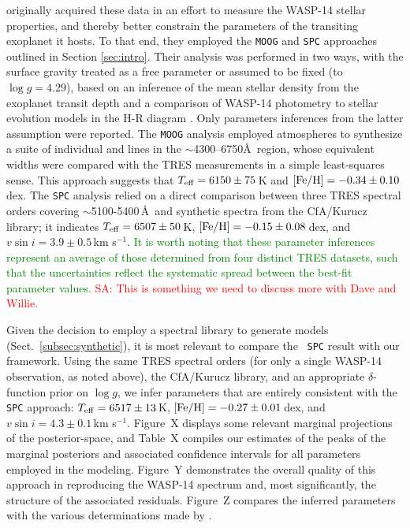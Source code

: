 \documentclass[iop,floatfix]{emulateapj}
\newcommand{\comm}[1]{ \textcolor{red}{SA: #1}}
\newcommand{\hili}[1]{ \textcolor{green}{#1}}
\begin{document}
\citet{torres12} originally acquired these data in an effort to measure the WASP-14 stellar 
properties, and thereby better constrain the parameters of the transiting exoplanet it hosts.  To 
that end, they employed the {\tt MOOG} and {\tt SPC} approaches outlined in Section 
\ref{sec:intro}.  Their analysis was performed in two ways, with the surface gravity treated as a 
free parameter or assumed to be fixed (to $\log g = 4.29$), based on an inference of the mean 
stellar density from the exoplanet transit depth and a comparison of WASP-14 photometry to stellar 
evolution models in the H-R diagram \citep{joshi09}.  Only parameters inferences from the latter 
assumption were reported.  The {\tt MOOG} analysis employed \citet{kurucz93} atmospheres to 
synthesize a suite of individual  and  lines in the $\sim$4300--6750\AA\ 
region, whose equivalent widths were compared with the TRES measurements in a simple least-squares 
sense.  This approach suggests that $T_{\rm eff} = 6150\pm75$\,K and $[{\rm Fe/H}] = 
-0.34\pm0.10$\,dex.  The {\tt SPC} analysis relied on a direct comparison between three TRES 
spectral orders covering $\sim$5100-5400\,\AA\ and synthetic spectra from the {\sc CfA/Kurucz} 
library; it indicates $T_{\rm eff} = 6507\pm50$\,K, $[{\rm Fe/H}] = -0.15\pm0.08$\,dex, and $v \sin 
i = 3.9\pm0.5$\,km s$^{-1}$.  \hili{It is worth noting that these parameter inferences represent an 
average of those determined from four distinct TRES datasets, such that the uncertainties reflect 
the systematic spread between the best-fit parameter values.} \comm{This is something we need to 
discuss more with Dave and Willie.}

Given the decision to employ a spectral library to generate models (Sect.~\ref{subsec:synthetic}), 
it is most relevant to compare the \citeauthor{torres12}~{\tt SPC} result with our framework.  
Using the same TRES spectral orders (for only a single WASP-14 observation, as noted above), the 
{\sc CfA/Kurucz} library, and an appropriate $\delta$-function prior on $\log g$, we infer 
parameters that are entirely consistent with the {\tt SPC} approach: $T_{\rm eff} = 6517\pm13$\,K, 
$[{\rm Fe/H}] = -0.27\pm0.01$\,dex, and $v \sin i = 4.3\pm0.1$\,km s$^{-1}$.  Figure~X displays 
some relevant marginal projections of the posterior-space, and Table~X compiles our estimates of 
the peaks of the marginal posteriors and associated confidence intervals for all parameters 
employed in the modeling.  Figure~Y demonstrates the overall quality of this approach in 
reproducing the WASP-14 spectrum and, most significantly, the structure of the associated 
residuals.  Figure~Z compares the inferred parameters with the various determinations made by 
\citet{torres12}.  
\end{document}
